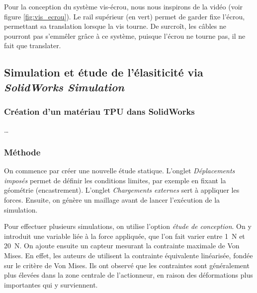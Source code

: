 \documentclass[a4paper, 11pt]{report}
\begin{document}
        Pour la conception du système vis-écrou, nous nous inspirons de la vidéo \cite{w3d_tech_systeme_2023} (voir figure \ref{fig:vis_ecrou}). Le rail supérieur (en vert) permet de garder fixe l'écrou, permettant sa translation lorsque la vis tourne. De surcroît, les câbles ne pourront pas s'emmêler grâce à ce système, puisque l'écrou ne tourne pas, il ne fait que translater.

    \subsection{Simulation et étude de l'élasiticité via \textit{SolidWorks Simulation}}

        \subsubsection{Création d'un matériau TPU dans SolidWorks}

            \dots

        \subsubsection{Méthode}

            On commence par créer une nouvelle étude statique. L’onglet \textit{Déplacements imposés} permet de définir les conditions limites, par exemple en fixant la géométrie (encastrement). L’onglet \textit{Chargements externes} sert à appliquer les forces. Ensuite, on génère un maillage avant de lancer l’exécution de la simulation.

            Pour effectuer plusieurs simulations, on utilise l’option \textit{étude de conception}. On y introduit une variable liée à la force appliquée, que l’on fait varier entre 1~N et 20~N. On ajoute ensuite un capteur mesurant la contrainte maximale de Von Mises. En effet, les auteurs de \cite{bhat_numerical_2025} utilisent la contrainte équivalente linéarisée, fondée sur le critère de Von Mises. Ils ont observé que les contraintes sont généralement plus élevées dans la zone centrale de l’actionneur, en raison des déformations plus importantes qui y surviennent.

    
    
    
\end{document}
